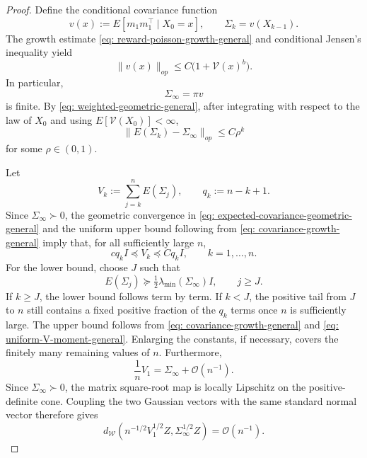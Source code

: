 \documentclass[11pt]{article}
\newcommand{\ve}{\mathscr{V}}
\begin{document}
\begin{proof}
Define the conditional covariance function
\[
    v(x):=E[m_1m_1^\top\mid X_0=x],
    \qquad
    \Sigma_k=v(X_{k-1}).
\]
The growth estimate \eqref{eq: reward-poisson-growth-general} and
conditional Jensen's inequality yield
\begin{equation}\label{eq: covariance-growth-general}
    \|v(x)\|_{op}
    \leq
    C\bigl(1+\ve(x)^b\bigr).
\end{equation}
In particular,
\[
    \Sigma_\infty=\pi v
\]
is finite. By \eqref{eq: weighted-geometric-general}, after integrating with
respect to the law of $X_0$ and using $E[\ve(X_0)]<\infty$,
\begin{equation}\label{eq: expected-covariance-geometric-general}
    \|E(\Sigma_k)-\Sigma_\infty\|_{op}
    \leq C\rho^k
\end{equation}
for some $\rho\in(0,1)$.

Let
\[
    V_k:=\sum_{j=k}^nE(\Sigma_j),
    \qquad
    q_k:=n-k+1.
\]
Since $\Sigma_\infty\succ0$, the geometric convergence in
\eqref{eq: expected-covariance-geometric-general} and the uniform upper
bound following from \eqref{eq: covariance-growth-general} imply that, for
all sufficiently large $n$,
\begin{equation}\label{eq: covariance-sum-general}
    c q_k I\preceq V_k\preceq Cq_k I,
    \qquad
    k=1,\ldots,n.
\end{equation}
For the lower bound, choose $J$ such that
\[
    E(\Sigma_j)\succeq
    \tfrac12\lambda_{\min}(\Sigma_\infty)I,
    \qquad j\geq J.
\]
If $k\geq J$, the lower bound follows term by term. If $k<J$, the positive
tail from $J$ to $n$ still contains a fixed positive fraction of the
$q_k$ terms once $n$ is sufficiently large. The upper bound follows from
\eqref{eq: covariance-growth-general} and
\eqref{eq: uniform-V-moment-general}. Enlarging the constants, if necessary,
covers the finitely many remaining values of $n$. Furthermore,
\begin{equation}\label{eq: target-covariance-general}
    \frac1nV_1
    =
    \Sigma_\infty+\mathcal O(n^{-1}).
\end{equation}
Since $\Sigma_\infty\succ0$, the matrix square-root map is locally Lipschitz
on the positive-definite cone. Coupling the two Gaussian vectors with the
same standard normal vector therefore gives
\[
    d_{\mathcal W}
    \left(
        n^{-1/2}V_1^{1/2}Z,
        \Sigma_\infty^{1/2}Z
    \right)
    =
    \mathcal O(n^{-1}).
\]


\end{proof}
\end{document}
